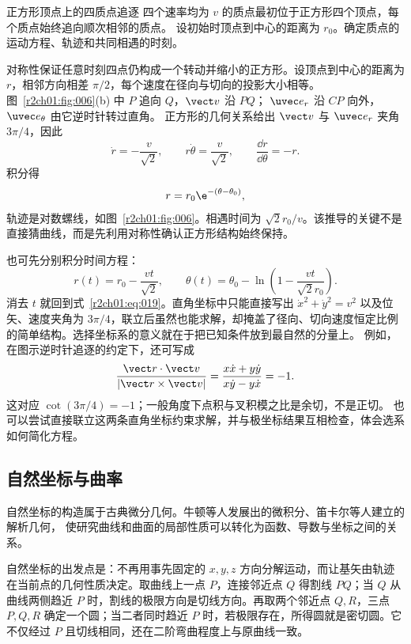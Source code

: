\begin{examplebox}{正方形顶点上的四质点追逐}
四个速率均为 $v$ 的质点最初位于正方形四个顶点，每个质点始终追向顺次相邻的质点。
设初始时顶点到中心的距离为 $r_0$。确定质点的运动方程、轨迹和共同相遇的时刻。
\label{r2ch01:ex:001}
\begin{solution}
对称性保证任意时刻四点仍构成一个转动并缩小的正方形。设顶点到中心的距离为 $r$，相邻方向相差 $\pi/2$，每个速度在径向与切向的投影大小相等。
图~\ref{r2ch01:fig:006}(b) 中 $P$ 追向 $Q$，$\vect v$ 沿 $PQ$；
$\uvec e_r$ 沿 $CP$ 向外，$\uvec e_\theta$ 由它逆时针转过直角。
正方形的几何关系给出 $\vect v$ 与 $\uvec e_r$ 夹角 $3\pi/4$，因此
\begin{equation}
  \dot r=-\frac{v}{\sqrt2},\qquad
  r\dot\theta=\frac{v}{\sqrt2},\qquad
  \frac{\dd r}{\dd\theta}=-r.
  \label{r2ch01:eq:018}
\end{equation}
积分得
\begin{equation}
  r=r_0\e^{-(\theta-\theta_0)},
  \label{r2ch01:eq:019}
\end{equation}
轨迹是对数螺线，如图~\ref{r2ch01:fig:006}。相遇时间为 $\sqrt2 r_0/v$。该推导的关键不是直接猜曲线，而是先利用对称性确认正方形结构始终保持。

也可先分别积分时间方程：
\[
  r(t)=r_0-\frac{vt}{\sqrt2},\qquad
  \theta(t)=\theta_0-\ln\left(1-\frac{vt}{\sqrt2r_0}\right).
\]
消去 $t$ 就回到式~\eqref{r2ch01:eq:019}。直角坐标中只能直接写出
$\dot x^2+\dot y^2=v^2$ 以及位矢、速度夹角为 $3\pi/4$，联立后虽然也能求解，却掩盖了径向、切向速度恒定比例的简单结构。选择坐标系的意义就在于把已知条件放到最自然的分量上。
例如，在图示逆时针追逐的约定下，还可写成
\[
 \frac{\vect r\cdot\vect v}{|\vect r\times\vect v|}
 =\frac{x\dot x+y\dot y}{x\dot y-y\dot x}=-1.
\]
这对应 $\cot(3\pi/4)=-1$；一般角度下点积与叉积模之比是余切，不是正切。
也可以尝试直接联立这两条直角坐标约束求解，并与极坐标结果互相检查，体会选系如何简化方程。

\figPursuitFour
\end{solution}
\end{examplebox}

\subsection{自然坐标与曲率}
\label{r2ch01:sec:frenet}

自然坐标的构造属于古典微分几何。牛顿等人发展出的微积分、笛卡尔等人建立的解析几何，
使研究曲线和曲面的局部性质可以转化为函数、导数与坐标之间的关系。

自然坐标的出发点是：不再用事先固定的 $x,y,z$ 方向分解运动，而让基矢由轨迹在当前点的几何性质决定。取曲线上一点 $P$，连接邻近点 $Q$ 得割线 $PQ$；当 $Q$ 从曲线两侧趋近 $P$ 时，割线的极限方向是切线方向。再取两个邻近点 $Q,R$，三点 $P,Q,R$ 确定一个圆；当二者同时趋近 $P$ 时，若极限存在，所得圆就是密切圆。它不仅经过 $P$ 且切线相同，还在二阶弯曲程度上与原曲线一致。

